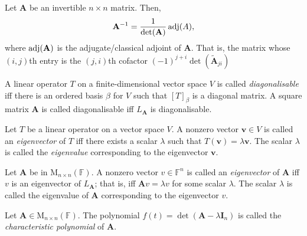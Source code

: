 \documentclass[../Notes.tex]{subfiles}
\begin{document}
\begin{theorem}{}{}
    Let \(\mathbf{A}\) be an invertible \(n\times n\) matrix. Then,
    \[\mathbf{A}^{-1}=\frac{1}{\det(\mathbf{A})}\operatorname{adj}(A),\]
    where \(\operatorname{adj}(\mathbf{A})\) is the adjugate/classical adjoint of \(\mathbf{A}\). That is, the matrix whose \((i,j)\)th entry is the \((j,i)\)th cofactor \((-1)^{j+i}\det(\widetilde{\mathbf{A}}_{ji})\)
\end{theorem}
\begin{definition}{}{}
    A linear operator \(T\) on a finite-dimensional vector space \(V\) is called \emph{diagonalisable} iff there is an ordered basis \(\beta\) for \(V\) such that \([T]_\beta\) is a diagonal matrix. A square matrix \(\mathbf{A}\) is called diagonalisable iff \(L_\mathbf{A}\) is diagonalisable.
\end{definition}
\begin{definition}{}{}
    Let \(T\) be a linear operator on a vector space \(V\). A nonzero vector \(\mathbf{v}\in V\) is called an \emph{eigenvector} of \(T\) iff there exists a scalar \(\lambda\) such that \(T(\mathbf{v})=\lambda \mathbf{v}\). The scalar \(\lambda\) is called the \emph{eigenvalue} corresponding to the eigenvector \(\mathbf{v}\).

    Let \(\mathbf{A}\) be in \(\mathrm{M}_{n\times n}(\mathbb{F})\). A nonzero vector \(v\in \mathbb{F}^n\) is called an \emph{eigenvector} of \(\mathbf{A}\) iff \(v\) is an eigenvector of \(L_\mathbf{A}\); that is, iff \(\mathbf{A}v=\lambda v\) for some scalar \(\lambda\). The scalar \(\lambda\) is called the eigenvalue of \(\mathbf{A}\) corresponding to the eigenvector \(v\).
\end{definition}
\begin{definition}{}{}
    Let \(\mathbf{A}\in \mathrm{M}_{n\times n}(\mathbb{F})\). The polynomial \(f(t)=\det(\mathbf{A}-\lambda \mathbf{I}_n)\) is called the \emph{characteristic polynomial} of \(\mathbf{A}\).
\end{definition}
\end{document}
